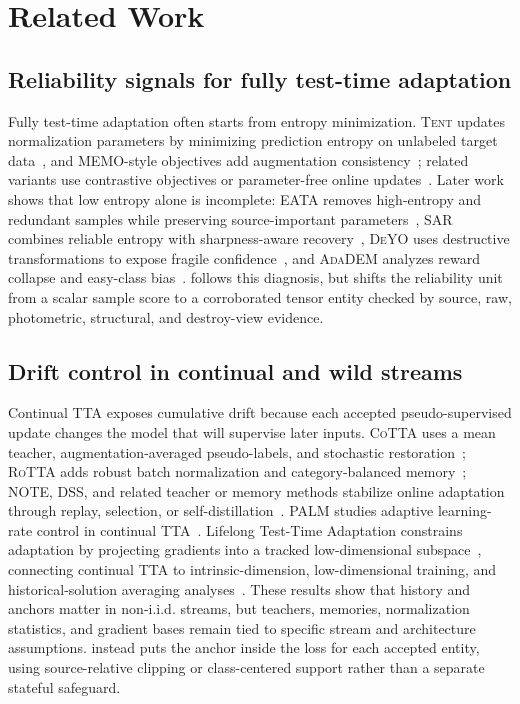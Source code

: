 \section{Related Work}

\subsection{Reliability signals for fully test-time adaptation}

Fully test-time adaptation often starts from entropy minimization. \textsc{Tent} updates normalization parameters by minimizing prediction entropy on unlabeled target data~\citep{wang2021tent}, and MEMO-style objectives add augmentation consistency~\citep{bartler2022memo}; related variants use contrastive objectives or parameter-free online updates~\citep{chen2022ctta,boudiaf2022potta}. Later work shows that low entropy alone is incomplete: \textsc{EATA} removes high-entropy and redundant samples while preserving source-important parameters~\citep{niu2022eata}, \textsc{SAR} combines reliable entropy with sharpness-aware recovery~\citep{niu2023sar}, \textsc{DeYO} uses destructive transformations to expose fragile confidence~\citep{lee2024deyo}, and \textsc{AdaDEM} analyzes reward collapse and easy-class bias~\citep{ma2025adadem}. \method{} follows this diagnosis, but \core{} shifts the reliability unit from a scalar sample score to a corroborated tensor entity checked by source, raw, photometric, structural, and destroy-view evidence.

\subsection{Drift control in continual and wild streams}

Continual TTA exposes cumulative drift because each accepted pseudo-supervised update changes the model that will supervise later inputs. \textsc{CoTTA} uses a mean teacher, augmentation-averaged pseudo-labels, and stochastic restoration~\citep{wang2022cotta}; \textsc{RoTTA} adds robust batch normalization and category-balanced memory~\citep{yuan2023rotta}; NOTE, DSS, and related teacher or memory methods stabilize online adaptation through replay, selection, or self-distillation~\citep{gong2022note,hong2024dss,song2023ecotta,doebler2023rmt}. PALM studies adaptive learning-rate control in continual TTA~\citep{maharana2025palm}. Lifelong Test-Time Adaptation constrains adaptation by projecting gradients into a tracked low-dimensional subspace~\citep{duan2025lifelong}, connecting continual TTA to intrinsic-dimension, low-dimensional training, and historical-solution averaging analyses~\citep{larsen2021intrinsic,li2022lowdim,li2023twa}. These results show that history and anchors matter in non-i.i.d. streams, but teachers, memories, normalization statistics, and gradient bases remain tied to specific stream and architecture assumptions. \care{} instead puts the anchor inside the loss for each accepted entity, using source-relative clipping or class-centered support rather than a separate stateful safeguard.

